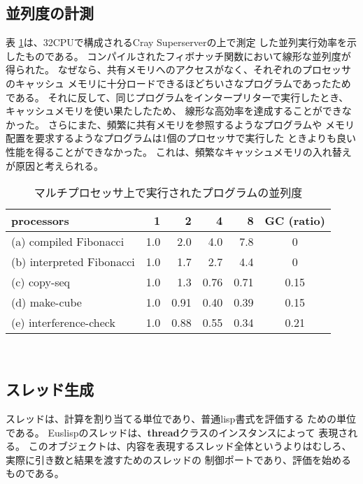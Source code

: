 \subsection{並列度の計測}

表 \ref{paragain}は、32CPUで構成されるCray Superserverの上で測定
した並列実行効率を示したものである。
コンパイルされたフィボナッチ関数において線形な並列度が得られた。
なぜなら、共有メモリへのアクセスがなく、それぞれのプロセッサのキャッシュ
メモリに十分ロードできるほどちいさなプログラムであったためである。
それに反して、同じプログラムをインタープリターで実行したとき、
キャッシュメモリを使い果たしたため、
線形な高効率を達成することができなかった。
さらにまた、頻繁に共有メモリを参照するようなプログラムや
メモリ配置を要求するようなプログラムは1個のプロセッサで実行した
ときよりも良い性能を得ることができなかった。
これは、頻繁なキャッシュメモリの入れ替えが原因と考えられる。

\begin{table}
\caption{\label{paragain}マルチプロセッサ上で実行されたプログラムの並列度}
\begin{center}
\begin{tabular}{|l|r|r|r|r|c|}  \hline
processors & 1 & 2 & 4 & 8 & GC (ratio) \\ \hline
(a) compiled Fibonacci & 1.0 & 2.0 & 4.0 & 7.8 & 0 \\ \hline
(b) interpreted Fibonacci & 1.0 & 1.7 & 2.7 & 4.4 & 0 \\ \hline
(c) copy-seq & 1.0 & 1.3 & 0.76 & 0.71 & 0.15 \\ \hline
(d) make-cube & 1.0 & 0.91 & 0.40 & 0.39 &  0.15 \\ \hline
(e) interference-check & 1.0 & 0.88 & 0.55 & 0.34 & 0.21 \\ \hline
\end{tabular} \\
\end{center}
\end{table}

\subsection{スレッド生成}
スレッドは、計算を割り当てる単位であり、普通lisp書式を評価する
ための単位である。
Euslispのスレッドは、{\bf thread}クラスのインスタンスによって
表現される。
このオブジェクトは、内容を表現するスレッド全体というよりはむしろ、
実際に引き数と結果を渡すためのスレッドの
制御ポートであり、評価を始めるものである。

